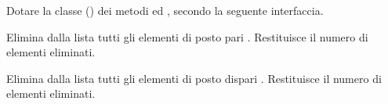 Dotare la classe  () dei metodi  ed , secondo la seguente interfaccia.

\begin{methodslist}

 {
Elimina dalla lista tutti gli elementi di posto pari . Restituisce il numero di elementi eliminati.
}

 {
Elimina dalla lista tutti gli elementi di posto dispari . Restituisce il numero di elementi eliminati.
}

\end{methodslist}